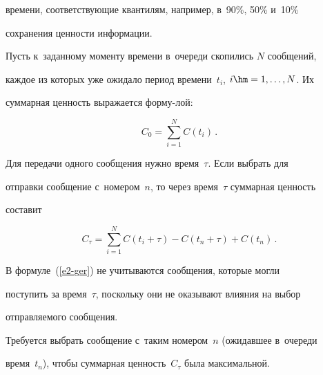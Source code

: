времени, со\-от\-вет\-ст\-ву\-ющие квантилям, например, в~90\%, 50\% и~10\% 


со\-хра\-не\-ния цен\-ности информации.


  











  Пусть к~заданному моменту времени в~очереди скопились $N$ сообщений, 


каж\-дое из которых уже ожидало период времени~$t_i$, $i\hm= 1,\ldots , N$. Их 


суммарная цен\-ность выражается форму-\linebreak лой:


  \begin{equation*}


  C_0=\sum\limits_{i=1}^N C(t_i)\,.




  \end{equation*}


  


  Для передачи одного сообщения нужно время~$\tau$. Если выбрать для 


отправки сообщение с~номером~$n$, то через время~$\tau$ суммарная цен\-ность 


со\-ставит


  \begin{equation}


  C_\tau= \sum\limits^N_{i=1} C\left(t_i+\tau\right) -C\left(t_n+\tau\right)+ C\left(t_n\right)\,.


  \label{e2-ger}


  \end{equation}


    В формуле~(\ref{e2-ger}) не учитываются сообщения, которые могли 


поступить за время~$\tau$, поскольку они не оказывают влияния на выбор 


отправляемого сообщения. 








  


  Требуется выбрать сообщение с~таким номером~$n$ (ожидавшее в~очереди 


время~$t_n$), чтобы суммарная цен\-ность~$C_\tau$ была максимальной.


